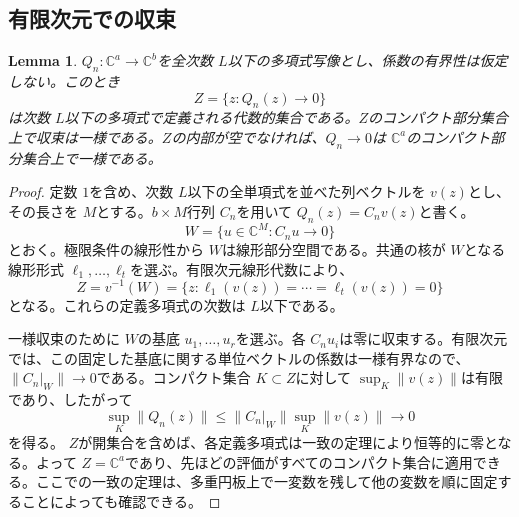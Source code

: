 \documentclass[12pt]{amsart}
\newtheorem{lem}[thm]{Lemma}
\theoremstyle{definition}
\theoremstyle{remark}
\numberwithin{equation}{section}
\newcommand{\C}{\mathbb{C}}
\begin{document}
\subsection{有限次元での収束}
\begin{lem}\label{lem:finite-ja}
\allowbreak$Q_n:\C^a\to\C^b$\allowbreak を全次数 \allowbreak$L$\allowbreak 以下の多項式写像とし、係数の有界性は仮定しない。このとき
\[
Z=\{z:Q_n(z)\to0\}
\]
は次数 \allowbreak$L$\allowbreak 以下の多項式で定義される代数的集合である。\allowbreak$Z$\allowbreak のコンパクト部分集合上で収束は一様である。\allowbreak$Z$\allowbreak の内部が空でなければ、\allowbreak$Q_n\to0$\allowbreak は \allowbreak$\C^a$\allowbreak のコンパクト部分集合上で一様である。
\end{lem}
\begin{proof}
定数 \allowbreak$1$\allowbreak を含め、次数 \allowbreak$L$\allowbreak 以下の全単項式を並べた列ベクトルを \allowbreak$v(z)$\allowbreak とし、その長さを \allowbreak$M$\allowbreak とする。\allowbreak$b\times M$\allowbreak 行列 \allowbreak$C_n$\allowbreak を用いて \allowbreak$Q_n(z)=C_nv(z)$\allowbreak と書く。
\[
W=\{u\in\C^M:C_nu\to0\}
\]
とおく。極限条件の線形性から \allowbreak$W$\allowbreak は線形部分空間である。共通の核が \allowbreak$W$\allowbreak となる線形形式 \allowbreak$\ell_1,\ldots,\ell_t$\allowbreak を選ぶ。有限次元線形代数により、
\[
Z=v^{-1}(W)=\{z:\ell_1(v(z))=\cdots=\ell_t(v(z))=0\}
\]
となる。これらの定義多項式の次数は \allowbreak$L$\allowbreak 以下である。

一様収束のために \allowbreak$W$\allowbreak の基底 \allowbreak$u_1,\ldots,u_r$\allowbreak を選ぶ。各 \allowbreak$C_nu_i$\allowbreak は零に収束する。有限次元では、この固定した基底に関する単位ベクトルの係数は一様有界なので、\allowbreak$\|C_n|_W\|\to0$\allowbreak である。コンパクト集合 \allowbreak$K\subset Z$\allowbreak に対して \allowbreak$\sup_K\|v(z)\|$\allowbreak は有限であり、したがって
\[
\sup_K\|Q_n(z)\|\leq\|C_n|_W\|\sup_K\|v(z)\|\longrightarrow0
\]
を得る。
\allowbreak$Z$\allowbreak が開集合を含めば、各定義多項式は一致の定理により恒等的に零となる。よって \allowbreak$Z=\C^a$\allowbreak であり、先ほどの評価がすべてのコンパクト集合に適用できる。ここでの一致の定理は、多重円板上で一変数を残して他の変数を順に固定することによっても確認できる。
\end{proof}
\end{document}
